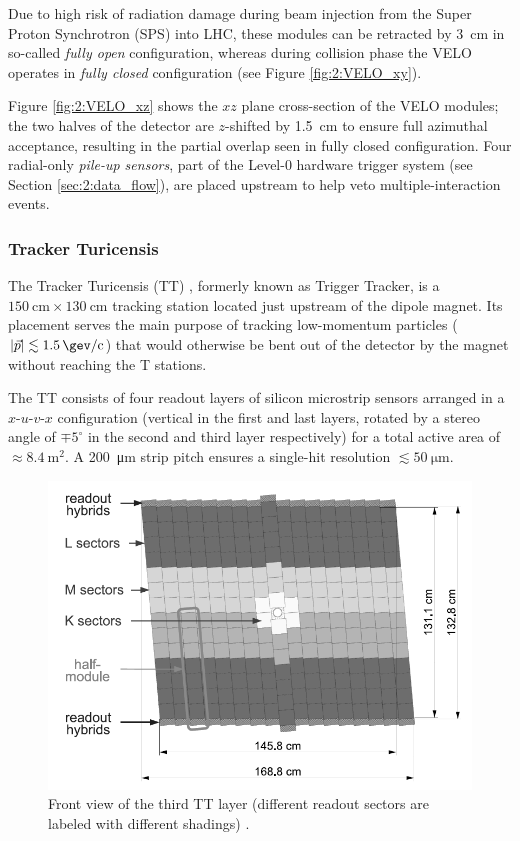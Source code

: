 Due to high risk of radiation damage during beam injection from the Super Proton Synchrotron (SPS) into LHC, these modules can be retracted by \SI{3}{\centi\meter} in so-called \textit{fully open} configuration, whereas during collision phase the VELO operates in \textit{fully closed} configuration (see Figure \ref{fig:2:VELO_xy}).

Figure \ref{fig:2:VELO_xz} shows the $xz$ plane cross-section of the VELO modules; the two halves of the detector are $z$-shifted by \SI{1.5}{\centi\meter} to ensure full azimuthal acceptance, resulting in the partial overlap seen in fully closed configuration.
Four radial-only \textit{pile-up sensors}, part of the Level-0 hardware trigger system (see Section \ref{sec:2:data_flow}), are placed upstream to help veto multiple-interaction events.

\subsubsection{Tracker Turicensis}
The Tracker Turicensis (TT) \cite{Gassner:728548}, formerly known as Trigger Tracker, is a $\SI{150}{\centi\meter} \times \SI{130}{\centi\meter}$ tracking station located just upstream of the dipole magnet.
Its placement serves the main purpose of tracking low-momentum particles ($|\vec{p}| \lesssim \SI{1.5}{\gev\per c}$) that would otherwise be bent out of the detector by the magnet without reaching the T stations.

The TT consists of four readout layers of silicon microstrip sensors arranged in a $x$-$u$-$v$-$x$ configuration (vertical in the first and last layers, rotated by a stereo angle of $\mp 5^\circ$ in the second and third layer respectively) for a total active area of $\approx \SI{8.4}{\meter\squared}$.
A \SI{200}{\micro\meter} strip pitch ensures a single-hit resolution $\lesssim \SI{50}{\micro\meter}$.

\begin{figure}[t]
	\centering
	\includegraphics[width=.6\textwidth]{graphics/02-lhcb/TT_layout.png}
	\caption[Front view of the third TT layer.]{Front view of the third TT layer (different readout sectors are labeled with different shadings) \cite{Alves:1129809}.}
	\label{fig:2:TT}
\end{figure}

